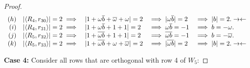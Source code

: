 \begin{lemma}
\begin{proof}
$$\begin{array}{rcllll}
      (h) & |\langle R_{4},r_{30}\rangle|=2 \implies & |1+\omega\overline{b}+\overline{\omega}+\omega|=2      &\implies |\omega\overline{b}| = 2         &\implies |b| = 2.   \rightarrow\leftarrow \\
      (i) & |\langle R_{4},r_{31}\rangle|=2 \implies & |1+\omega\overline{b}+1+1|=2            &\implies \omega\overline{b} = -1          &\implies b = -\omega.          \\
      (j) & |\langle R_{5},r_{32}\rangle|=2 \implies & |1+\overline{\omega b}+1+1|=2       &\implies \overline{\omega b} = -1     &\implies b = -\overline{\omega}.    \\
      (k) & |\langle R_{5},r_{33}\rangle|=2 \implies & |1+\overline{\omega b}+\omega+\overline{\omega}|=2 &\implies |\overline{\omega b}|=2      &\implies |b| = 2.   \rightarrow\leftarrow
     \end{array}
     $$


     {\bf Case 4:} Consider all rows that are orthogonal with row 4 of $W_5$:


\end{proof}
\end{lemma}
